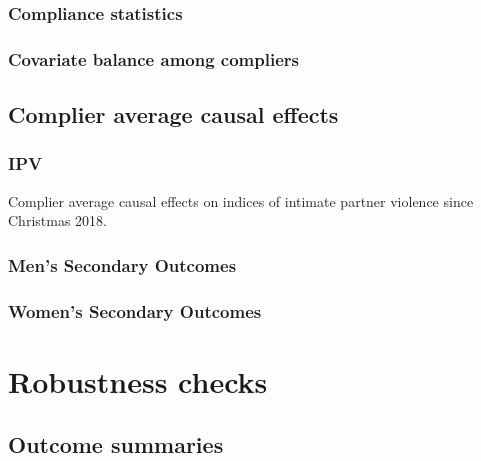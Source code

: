 \documentclass[11pt,english]{article}
\begin{document}
\subsubsection{Compliance statistics}

\subsubsection{Covariate balance among compliers}



\subsection{Complier average causal effects}

\subsubsection{IPV}

\begin{table}[H]
\centering

\caption{Complier average causal effects on indices of intimate partner violence since Christmas 2018.}
\label{tab:ompliers_ipv}
\end{table}

\subsubsection{Men's Secondary Outcomes}

\subsubsection{Women's Secondary Outcomes}

\section{Robustness checks}

\subsection{Outcome summaries}
\end{document}
